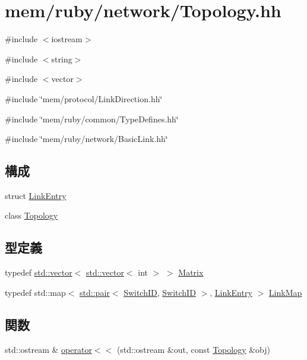 \hypertarget{Topology_8hh}{
\section{mem/ruby/network/Topology.hh}
\label{Topology_8hh}
}
{\ttfamily \#include $<$iostream$>$}\par
{\ttfamily \#include $<$string$>$}\par
{\ttfamily \#include $<$vector$>$}\par
{\ttfamily \#include \char`\"{}mem/protocol/LinkDirection.hh\char`\"{}}\par
{\ttfamily \#include \char`\"{}mem/ruby/common/TypeDefines.hh\char`\"{}}\par
{\ttfamily \#include \char`\"{}mem/ruby/network/BasicLink.hh\char`\"{}}\par
\subsection*{構成}
\begin{DoxyCompactItemize}
\item 
struct \hyperlink{structLinkEntry}{LinkEntry}
\item 
class \hyperlink{classTopology}{Topology}
\end{DoxyCompactItemize}
\subsection*{型定義}
\begin{DoxyCompactItemize}
\item 
typedef \hyperlink{classstd_1_1vector}{std::vector}$<$ \hyperlink{classstd_1_1vector}{std::vector}$<$ int $>$ $>$ \hyperlink{Topology_8hh_ac482d2042aa01f64da22d39e9f469d8d}{Matrix}
\item 
typedef std::map$<$ \hyperlink{classstd_1_1pair}{std::pair}$<$ \hyperlink{TypeDefines_8hh_ac925a332c83eaf1e40e056e7a20ebcd8}{SwitchID}, \hyperlink{TypeDefines_8hh_ac925a332c83eaf1e40e056e7a20ebcd8}{SwitchID} $>$, \hyperlink{structLinkEntry}{LinkEntry} $>$ \hyperlink{Topology_8hh_a4d8351b0e997e9522e41a5f481d9abfd}{LinkMap}
\end{DoxyCompactItemize}
\subsection*{関数}
\begin{DoxyCompactItemize}
\item 
std::ostream \& \hyperlink{Topology_8hh_a433a66045832859d10ca81b32bb53d63}{operator$<$$<$} (std::ostream \&out, const \hyperlink{classTopology}{Topology} \&obj)
\end{DoxyCompactItemize}


